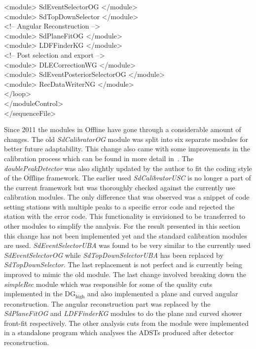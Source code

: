     \null\qquad \quad   <module> SdEventSelectorOG </module>\\
    \null\qquad \quad   <module> SdTopDownSelector </module>\\
    \null\qquad \quad  <!-- Angular Reconstruction -->\\
    \null\qquad \quad   <module> SdPlaneFitOG </module>\\
    \null\qquad \quad   <module> LDFFinderKG </module>\\
    \null\qquad \quad  <!-- Post selection and export -->\\
    \null\qquad \quad   <module> DLECorrectionWG </module>\\
    \null\qquad \quad   <module> SdEventPosteriorSelectorOG </module>\\
    \null\qquad \quad   <module> RecDataWriterNG </module>\\
  \null \qquad  </loop>\\
  \null \quad  </moduleControl>\\
   </sequenceFile>\\
\endgroup

Since 2011 the modules in Offline have gone through a considerable amount of changes. The old \textit{SdCalibratorOG} module was split into six separate modules for better future adaptability. This change also came with some improvements in the calibration process which can be found in more detail in~\cite{Baseline_update}. The \textit{doublePeakDetector} was also slightly updated by the author to fit the coding style of the $\mathrm{\overline{Off}\underline{line}}$ framework. The earlier used \textit{SdCalibratorUSC} is no longer a part of the current framework but was thoroughly checked against the currently use calibration modules. The only difference that was observed was a snippet of code setting stations with multiple peaks to a specific error code and rejected the station with the error code. This functionality is envisioned to be transferred to other modules to simplify the analysis. For the result presented in this section this change has not been implemented yet and the standard calibration modules are used. \textit{SdEventSelectorUBA} was found to be very similar to the currently used \textit{SdEventSelectorOG} while \textit{SdTopDownSelectorUBA} has been replaced by \textit{SdTopDownSelector}. The last replacement is not perfect and is currently being improved to mimic the old module. The last change involved breaking down the \textit{simpleRec} module which was responsible for some of the quality cuts implemented in the DG$\mathrm{_{high}}$ and also implemented a plane and curved angular reconstruction. The angular reconstruction part was replaced by the \textit{SdPlaneFitOG} and \textit{LDFFinderKG} modules to do the plane and curved shower front-fit respectively. The other analysis cuts from the module were implemented in a standalone program which analyses the ADSTs produced after detector reconstruction. 

